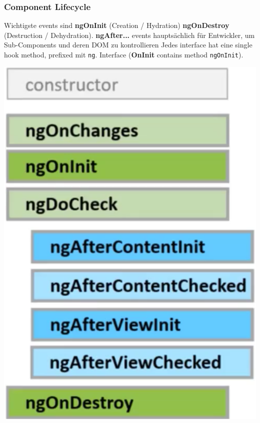 \subsubsection{Component Lifecycle}
\begin{minipage}{0.65\linewidth}
Wichtigste events sind
\textbf{ngOnInit} (Creation / Hydration)
\textbf{ngOnDestroy} (Destruction / Dehydration).
\textbf{ngAfter...} events hauptsächlich für Entwickler, um Sub-Components und deren DOM zu kontrollieren
Jedes interface hat eine single hook method, prefixed mit \texttt{\tiny ng}.
Interface (\textbf{OnInit} contains method \texttt{\tiny ngOnInit}).
\end{minipage}
\begin{minipage}{0.31\linewidth}
    \begin{center}
        \includegraphics[width=1.1\linewidth]{./img/04-angular/component_lifecycle}
        \vspace{-8pt}
    \end{center}
\end{minipage}

